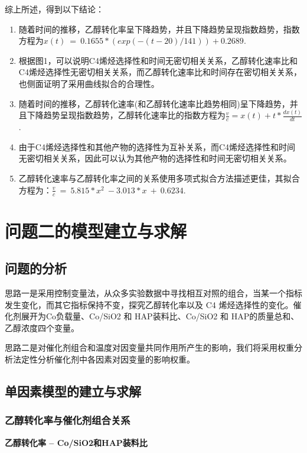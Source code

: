 \documentclass[withoutpreface,bwprint]{cumcmthesis} %
\begin{document}
综上所述，得到以下结论：

\begin{enumerate}
	\item 随着时间的推移，乙醇转化率呈下降趋势，并且下降趋势呈现指数趋势，指数方程为$x(t)\ =\ 0.1655\ast(exp(-(t-20)/141))+0.2689$.
	\item 根据图1，可以说明C4烯烃选择性和时间无密切相关关系，乙醇转化速率比和C4烯烃选择性无密切相关关系，而乙醇转化速率比和时间存在密切相关关系，也侧面证明了采用曲线拟合的合理性。
	
	\item 随着时间的推移，乙醇转化速率(和乙醇转化速率比趋势相同)呈下降趋势，并且下降趋势呈现指数趋势，乙醇转化速率比的指数方程为$\frac{v}{c}=x(t)+t\ast\frac{dx(t)}{dt}$.
	
	\item 由于C4烯烃选择性和其他产物的选择性为互补关系，而C4烯烃选择性和时间无密切相关关系，因此可以认为其他产物的选择性和时间无密切相关关系。
	
	\item 乙醇转化速率与乙醇转化率之间的关系使用多项式拟合方法描述更佳，其拟合方程为：$\frac{v}{c}\ =\ 5.815\ast x^2\ -3.013\ast x\ +\ 0.6234$.	
\end{enumerate}


\section{问题二的模型建立与求解}
\subsection{问题的分析}
思路一是采用控制变量法，从众多实验数据中寻找相互对照的组合，当某一个指标发生变化，而其它指标保持不变，探究乙醇转化率以及 C4 烯烃选择性的变化。催化剂展开为Co负载量、Co/SiO2 和 HAP装料比、Co/SiO2 和 HAP的质量总和、乙醇浓度四个变量。

思路二是对催化剂组合和温度对因变量共同作用所产生的影响，我们将采用权重分析法定性分析催化剂中各因素对因变量的影响权重。


\subsection{单因素模型的建立与求解}
\subsubsection{乙醇转化率与催化剂组合关系}
\textbf{乙醇转化率 -- Co/SiO2和HAP装料比}
\end{document}
